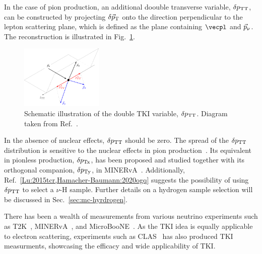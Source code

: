     In the case of pion production, an additional doouble transverse variable, $\delta p_\textrm{TT}$, can be constructed by projecting $\delta \vec{p}_\textrm{T}$ onto the direction perpendicular to the lepton scattering plane, which is defined as the plane containing $\vecpl$ and $\vec{p}_{\nu}$.
    The reconstruction is illustrated in Fig.~\ref{fig:dtki}.
    \begin{figure}
        \centering
        \includegraphics[width=0.35\textwidth]{figures/dptt.pdf}
        \caption{\label{fig:dtki} Schematic illustration of the double TKI variable, $\delta p_\textrm{TT}$. Diagram taken from Ref.~\cite{T2K:2021naz}.}
    \end{figure}
    In the absence of nuclear effects, $\delta p_\textrm{TT}$ should be zero.
    The spread of the $\delta p_\textrm{TT}$ distribution is sensitive to the nuclear effects in pion production~\cite{MINERvA:2020anu, T2K:2021naz}.
    Its equivalent in pionless production, $\delta p_\textrm{Tx}$, has been proposed and studied together with its orthogonal companion, $\delta p_\textrm{Ty}$, in MINERvA~\cite{MINERvA:2019ope}.
    Additionally, Ref.~\ref{Lu:2015tcr,Hamacher-Baumann:2020ogq} suggests the possibility of using $\delta p_\textrm{TT}$ to select a $\nu$-H sample.
    Further details on a hydrogen sample selection will be discussed in Sec.~\ref{sec:mc-hyrdrogen}.
    
    There has been a wealth of measurements from various neutrino experiments such as  T2K~\cite{T2K:2018rnz, T2K:2021naz}, MINERvA~\cite{MINERvA:2018hba, MINERvA:2019ope, MINERvA:2020anu, MINERvA:2021csy}, and MicroBooNE~\cite{MicroBooNE:2022emb, MicroBooNE:2023cmw, MicroBooNE:2023tzj, MicroBooNE:2023wzy, MicroBooNE:2024tmp}.
    As the TKI idea is equally applicable to electron scattering, experiments such as CLAS~\cite{CLAS:2021neh} has also produced TKI measurments, showcasing the efficacy and wide applicability of TKI. 




